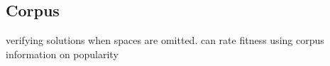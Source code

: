 
\subsection{Corpus}

verifying solutions when spaces are omitted. can rate fitness using corpus information on popularity

